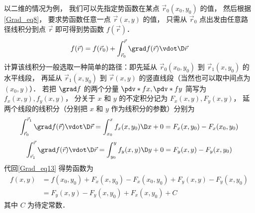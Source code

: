 以二维的情况为例， 我们可以先指定势函数在某点 $\vec r_0 (x_0,y_0)$ 的值， 然后根据\autoref{Grad_eq8}， 要求势函数任意一点 $\vec r (x,y)$ 的值， 只需从 $\vec r_0$ 点出发由任意路径线积分到点 $\vec r$ 即可得到势函数 $f(\vec r)$．
\begin{equation}\label{Grad_eq13}
f(\vec r) =  f(\vec r_0) + \int_{\vec r_0}^{\vec r} \grad f(\vec r) \vdot \D \vec r 
\end{equation}
计算该线积分一般选取一种简单的路径：即先延从 $\vec r_0(x_0,y_0)$ 到 $\vec r_1(x, y_0)$ 的水平线段， 再延从 $\vec r_1(x, y_0)$ 到 $\vec r(x,y)$ 的竖直线段（当然也可以取中间点为 $(x_0,y)$）． 若把 $\grad f$ 的两个分量 $\pdv*{f}{x}, \pdv*{f}{y}$ 简写为 $f_x(x,y), f_y(x,y)$， 分关于 $x$ 和 $y$ 的不定积分记为 $F_x(x,y), F_y(x,y)$， 延两个线段的线积分（分别把 $x$ 和 $y$ 作为线积分的参数）分别为
\begin{equation}
 \int_{\vec r_0}^{\vec r_1} \grad f(\vec r) \vdot \D \vec r = \int_{x_0}^{x} f_x(x,y_0) \D x + 0 = F_x(x,y_0) - F_x(x_0,y_0)
\end{equation}
\begin{equation}
 \int_{\vec r_1}^{\vec r} \grad f(\vec r) \vdot \D \vec r = \int_{y_0}^{y} f_y(x,y) \D y + 0 = F_y(x,y) - F_y(x,y_0)
\end{equation}
代回\autoref{Grad_eq13} 得势函数为
\begin{equation}\label{Grad_eq23}\begin{aligned}
f(x,y) &= f(x_0,y_0) + F_x(x,y_0) - F_x(x_0,y_0) + F_y(x,y) - F_y(x,y_0) \\
&= F_y(x,y) - F_y(x,y_0) + F_x(x,y_0) + C
\end{aligned}\end{equation}
其中 $C$ 为待定常数．


